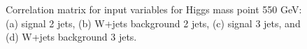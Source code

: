 \begin{figure}[bthp!]
{}


\caption{\label{fig:FigCorr550Mu} 
Correlation matrix for input variables for Higgs mass point 550 GeV:
(a) signal 2 jets, (b) W+jets background 2 jets, 
(c) signal 3 jets, and (d) W+jets background 3 jets.
}
\end{figure}
\newpage
